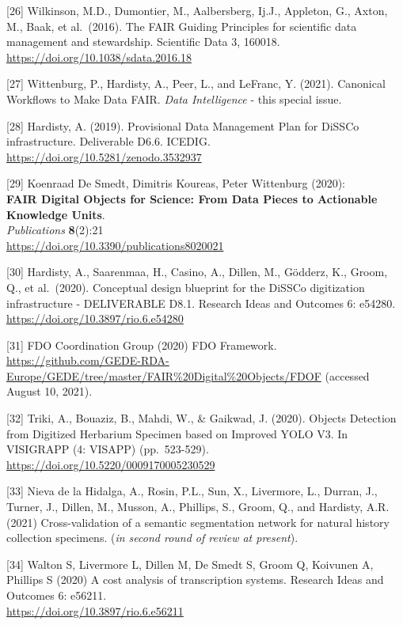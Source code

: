 {[}26{]} Wilkinson, M.D., Dumontier, M., Aalbersberg, Ij.J., Appleton,
G., Axton, M., Baak, et al.~(2016). The FAIR Guiding Principles for
scientific data management and stewardship. Scientific Data 3, 160018.\\
\url{https://doi.org/10.1038/sdata.2016.18}

{[}27{]} Wittenburg, P., Hardisty, A., Peer, L., and LeFranc, Y. (2021).
Canonical Workflows to Make Data FAIR. \emph{Data Intelligence} - this
special issue.

{[}28{]} Hardisty, A. (2019). Provisional Data Management Plan for
DiSSCo infrastructure. Deliverable D6.6. ICEDIG.\\
\url{https://doi.org/10.5281/zenodo.3532937}

{[}29{]} Koenraad De Smedt, Dimitris Koureas, Peter Wittenburg (2020):\\
\textbf{FAIR Digital Objects for Science: From Data Pieces to Actionable
Knowledge Units}.\\
\emph{Publications} \textbf{8}(2):21\\
\url{https://doi.org/10.3390/publications8020021}

{[}30{]} Hardisty, A., Saarenmaa, H., Casino, A., Dillen, M., Gödderz,
K., Groom, Q., et al.~(2020). Conceptual design blueprint for the DiSSCo
digitization infrastructure - DELIVERABLE D8.1. Research Ideas and
Outcomes 6: e54280.\\
\url{https://doi.org/10.3897/rio.6.e54280}

{[}31{]} FDO Coordination Group (2020) FDO Framework.\\
\url{https://github.com/GEDE-RDA-Europe/GEDE/tree/master/FAIR\%20Digital\%20Objects/FDOF}
(accessed August 10, 2021).

{[}32{]} Triki, A., Bouaziz, B., Mahdi, W., \& Gaikwad, J. (2020).
Objects Detection from Digitized Herbarium Specimen based on Improved
YOLO V3. In VISIGRAPP (4: VISAPP) (pp.~523-529).\\
\url{https://doi.org/10.5220/0009170005230529}

{[}33{]} Nieva de la Hidalga, A., Rosin, P.L., Sun, X., Livermore, L.,
Durran, J., Turner, J., Dillen, M., Musson, A., Phillips, S., Groom, Q.,
and Hardisty, A.R. (2021) Cross-validation of a semantic segmentation
network for natural history collection specimens. (\emph{in second round
of review at present}).

{[}34{]} Walton S, Livermore L, Dillen M, De Smedt S, Groom Q, Koivunen
A, Phillips S (2020) A cost analysis of transcription systems. Research
Ideas and Outcomes 6: e56211.\\
\url{https://doi.org/10.3897/rio.6.e56211}

